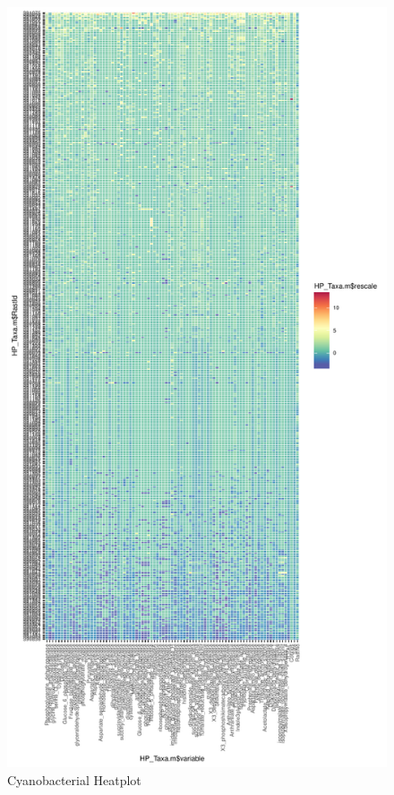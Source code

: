 \documentclass[12pt,twoside]{reedthesis}
\begin{document}
  \begin{figure}[h!tbp]
  \centering
  \includegraphics[angle = 0,scale = 0.6]{chapter5/HeatPlot.pdf}
  \caption[Cyanobacterial Heatplot]{\normalsize{Cyanobacterial Heatplot}}
  \label{fig:CyanoPlot}
  \end{figure}
  
\end{document}
